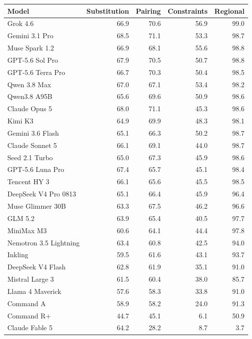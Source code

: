 \begin{tabular}{@{}l r r r r@{}}
\toprule
Model & Substitution & Pairing & Constraints & Regional \\
\midrule
Grok 4.6 & 66.9 & 70.6 & 56.9 & 99.0 \\
Gemini 3.1 Pro & 68.5 & 71.1 & 53.3 & 98.7 \\
Muse Spark 1.2 & 66.9 & 68.1 & 55.6 & 98.8 \\
GPT-5.6 Sol Pro & 67.9 & 70.5 & 50.7 & 98.8 \\
GPT-5.6 Terra Pro & 66.7 & 70.3 & 50.4 & 98.5 \\
Qwen 3.8 Max & 67.0 & 67.1 & 53.4 & 98.2 \\
Qwen3.8 A95B & 65.6 & 69.6 & 50.9 & 98.6 \\
Claude Opus 5 & 68.0 & 71.1 & 45.3 & 98.6 \\
Kimi K3 & 64.9 & 69.9 & 48.3 & 98.1 \\
Gemini 3.6 Flash & 65.1 & 66.3 & 50.2 & 98.7 \\
Claude Sonnet 5 & 66.1 & 69.1 & 44.0 & 98.7 \\
Seed 2.1 Turbo & 65.0 & 67.3 & 45.9 & 98.6 \\
GPT-5.6 Luna Pro & 67.4 & 65.7 & 45.1 & 98.4 \\
Tencent HY 3 & 66.1 & 65.6 & 45.5 & 98.5 \\
DeepSeek V4 Pro 0813 & 65.1 & 66.4 & 45.9 & 96.4 \\
Muse Glimmer 30B & 63.3 & 67.5 & 46.2 & 96.6 \\
GLM 5.2 & 63.9 & 65.4 & 40.5 & 97.7 \\
MiniMax M3 & 60.6 & 64.1 & 44.4 & 97.8 \\
Nemotron 3.5 Lightning & 63.4 & 60.8 & 42.5 & 94.0 \\
Inkling & 59.5 & 61.6 & 43.1 & 93.7 \\
DeepSeek V4 Flash & 62.8 & 61.9 & 35.1 & 91.0 \\
Mistral Large 3 & 61.5 & 60.4 & 38.0 & 85.7 \\
Llama 4 Maverick & 57.6 & 58.3 & 33.8 & 91.0 \\
Command A & 58.9 & 58.2 & 24.0 & 91.3 \\
Command R+ & 44.7 & 45.1 & 6.1 & 50.9 \\
Claude Fable 5 & 64.2 & 28.2 & 8.7 & 3.7 \\
\bottomrule
\end{tabular}
